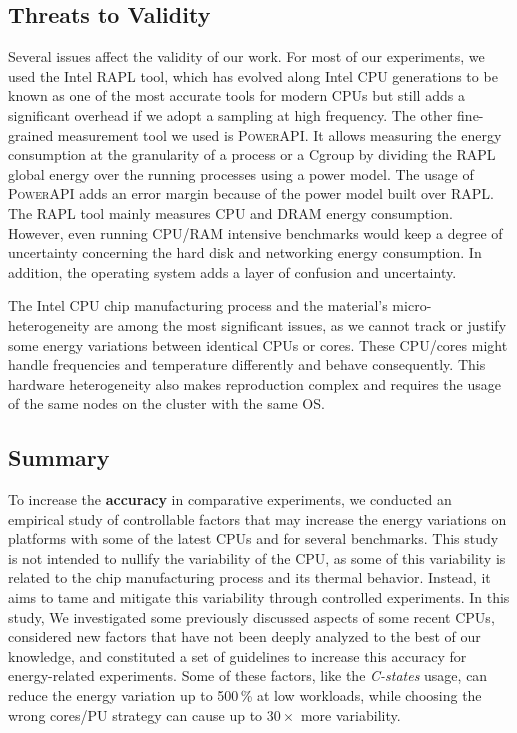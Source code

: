 \subsection{Threats to Validity}
Several issues affect the validity of our work.
For most of our experiments, we used the Intel RAPL tool, which has evolved along Intel CPU generations to be known as one of the most accurate tools for modern CPUs but still adds a significant overhead if we adopt a sampling at high frequency.
The other fine-grained measurement tool we used is \textsc{PowerAPI}.
It allows measuring the energy consumption at the granularity of a process or a Cgroup by dividing the RAPL global energy over the running processes using a power model.
The usage of \textsc{PowerAPI} adds an error margin because of the power model built over RAPL.
The RAPL tool mainly measures CPU and DRAM energy consumption.
However, even running CPU/RAM intensive benchmarks would keep a degree of uncertainty concerning the hard disk and networking energy consumption.
In addition, the operating system adds a layer of confusion and uncertainty.

The Intel CPU chip manufacturing process and the material's micro-heterogeneity are among the most significant issues, as we cannot track or justify some energy variations between identical CPUs or cores.
These CPU/cores might handle frequencies and temperature differently and behave consequently.
This hardware heterogeneity also makes reproduction complex and requires the usage of the same nodes on the cluster with the same OS.


\subsection{Summary}
To increase the \textbf{accuracy} in comparative experiments, we conducted an empirical study of controllable factors that may increase the energy variations on platforms with some of the latest CPUs and for several benchmarks.
This study is not intended to nullify the variability of the CPU, as some of this variability is related to the chip manufacturing process and its thermal behavior. Instead, it aims to tame and mitigate this variability through controlled experiments.
In this study, We investigated some previously discussed aspects of some recent CPUs, considered new factors that have not been deeply analyzed to the best of our knowledge, and constituted a set of guidelines to increase this accuracy for energy-related experiments.
Some of these factors, like the \emph{C-states} usage, can reduce the energy variation up to 500\,\% at low workloads, while choosing the wrong cores/PU strategy can cause up to $30\times$ more variability.
